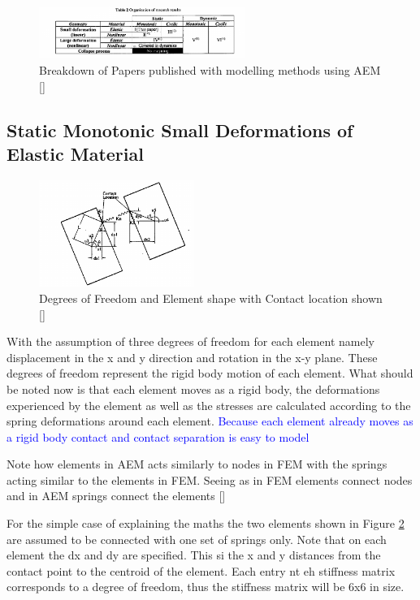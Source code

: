 \begin{figure}[H]
\centering
\includegraphics[width=0.6\textwidth]{../AEM_paper_series.png}
\caption{Breakdown of Papers published with modelling methods using AEM [\cite{First_AEM}]}
\label{fig:AEM_paper_series}
\end{figure}

\newpage

\subsection{Static Monotonic Small Deformations of Elastic Material}

\begin{figure}[H]
\centering
\includegraphics[width=0.45\textwidth]{../Element_shape_DOF.png}
\caption{Degrees of Freedom and Element shape with Contact location shown [\cite{First_AEM}]}
\label{fig:Element_shape_DOF}
\end{figure}


With the assumption of three degrees of freedom for each element namely displacement in the x and y direction and rotation in the x-y plane.  These degrees of freedom represent the rigid body motion of each element.  What should be noted now is that each element moves as a rigid body, the deformations experienced by the element as well as the stresses are calculated according to the spring deformations around each element.  \textcolor{blue}{Because each element already moves as a rigid body contact and contact separation is easy to model}

Note how elements in AEM acts similarly to nodes in FEM with the springs acting similar to the elements in FEM.  Seeing as in FEM elements connect nodes and in AEM springs connect the elements [\cite{Blog_python_AEM}]

For the simple case of explaining the maths the two elements shown in Figure \ref{fig:Element_shape_DOF} are assumed to be connected with one set of springs only.  Note that on each element the dx and dy are specified.  This si the x and y distances from the contact point to the centroid of the element.  Each entry nt eh stiffness matrix corresponds to a degree of freedom, thus the stiffness matrix will be 6x6 in size. 

